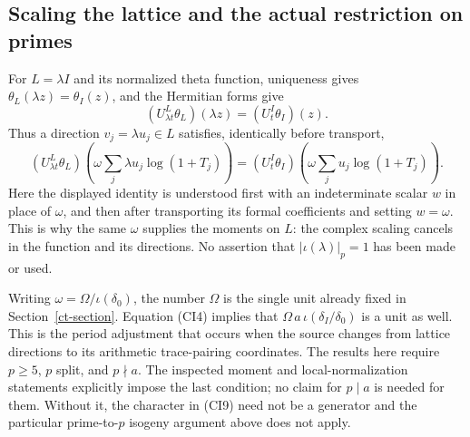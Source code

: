 \subsection{Scaling the lattice and the actual restriction on primes}

For $L=\lambda I$ and its normalized theta function,
uniqueness gives $\theta_L(\lambda z)=\theta_I(z)$, and
the Hermitian forms give
\[
          (U_{\lambda t}^{L}\theta_L)(\lambda z)
                           =(U_t^{I}\theta_I)(z).
 \tag{CI13}
\]
Thus a direction $v_j=\lambda u_j\in L$ satisfies, identically
before transport,
\[
 (U_{\lambda t}^{L}\theta_L)
       \left(\omega\sum_j\lambda u_j\log(1+T_j)\right)
 =
 (U_t^{I}\theta_I)
       \left(\omega\sum_j u_j\log(1+T_j)\right).
 \tag{CI14}
\]
Here the displayed identity is understood first with an
indeterminate scalar $w$ in place of $\omega$, and then
after transporting its formal coefficients and setting
$w=\omega$.  This is why the same $\omega$ supplies the moments on
$L$: the complex scaling cancels in the function and
its directions.  No assertion that $|\iota(\lambda)|_p=1$
has been made or used.

Writing $\omega=\Omega/\iota(\delta_0)$, the number $\Omega$
is the single unit already fixed in Section~\ref{ct-section}.
Equation (CI4) implies that
$\Omega\,a\,\iota(\delta_I/\delta_0)$ is a unit as well.
This is the period adjustment that occurs when the source
changes from lattice directions to its arithmetic
trace-pairing coordinates.
The results here require $p\ge5$, $p$ split, and $p\nmid a$.
The inspected moment and local-normalization statements
explicitly impose the last condition; no claim for $p\mid a$
is needed for them.  Without it, the character in (CI9)
need not be a generator and the particular prime-to-$p$
isogeny argument above does not apply.


